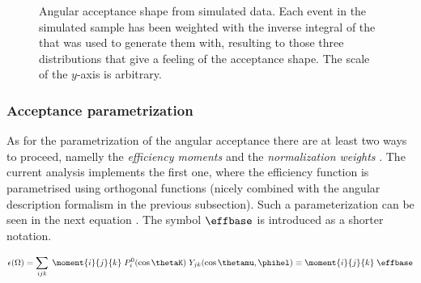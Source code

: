 \begin{figure}[h]
  \centering
  \begin{subfigure}{0.49\textwidth}
    \scalebox{1.3}{}
    \caption{}
    \label{angAcc_ctk}
  \end{subfigure}%
  \hfill%
  \begin{subfigure}{0.49\textwidth}
    \scalebox{1.3}{}
    \caption{}
    \label{angAcc_ctl}
  \end{subfigure}

  \vspace*{0.02\textwidth}
  \begin{subfigure}{0.49\textwidth}
    \scalebox{1.3}{}
    \caption{}
    \label{angAcc_phi}
  \end{subfigure}
  \caption{Angular acceptance shape from simulated data. Each event in the simulated sample has been weighted with the inverse integral 
           of the \pdf that was used to generate them with, resulting to those three distributions that give a feeling of the acceptance shape.
           The scale of the $y$-axis is arbitrary.}
\end{figure}

\subsubsection{Acceptance parametrization}
As for the parametrization of the angular acceptance there are at least two ways to proceed,
namelly the \emph{efficiency moments} \cite{jeroenThesis} and the \emph{normalization weights} \cite{tristanThesis,jeroenThesis}. 
The current analysis implements the first one, where the efficiency function is parametrised using orthogonal functions (nicely
combined with the angular description formalism in the previous subsection). Such a parameterization can be seen in the next equation 
. The symbol $\effbase$ is introduced as a shorter notation.

\begin{center}
\begin{equation}
  \epsilon(\Omega) = \sum_{ijk} \; \moment{i}{j}{k} \; P_i^0(\cos\thetaK) \; Y_{jk}(\cos\thetamu,\phihel) \equiv \moment{i}{j}{k} \; \effbase
  \label{eff_func}
\end{equation}
\end{center}

